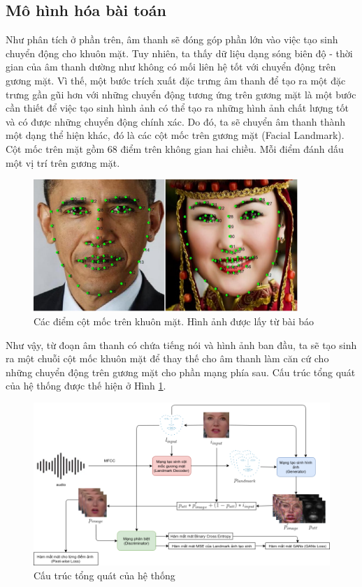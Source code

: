 \subsection{Mô hình hóa bài toán}\label{sec:modeling}

Như phân tích ở phần trên, âm thanh sẽ đóng góp phần lớn vào việc tạo sinh chuyển động cho khuôn mặt. Tuy nhiên, ta thấy dữ liệu dạng sóng biên độ - thời gian của âm thanh dường như không có mối liên hệ tốt với chuyển động trên gương mặt. Vì thế, một bước trích xuất đặc trưng âm thanh để tạo ra một đặc trưng gần gũi hơn với những chuyển động tương ứng trên gương mặt là một bước cần thiết để việc tạo sinh hình ảnh có thể tạo ra những hình ảnh chất lượng tốt và có được những chuyển động chính xác. Do đó, ta sẽ chuyển âm thanh thành một dạng thể hiện khác, đó là các cột mốc trên gương mặt (Facial Landmark). Cột mốc trên mặt gồm 68 điểm trên không gian hai chiều. Mỗi điểm đánh dấu một vị trí trên gương mặt.

\begin{figure}[H]
    \centering
    \includegraphics[width=10cm]{./content/materials/landmark_intro.png}
    \caption{Các điểm cột mốc trên khuôn mặt. Hình ảnh được lấy từ bài báo \cite{landmark}}
\end{figure}

Như vậy, từ đoạn âm thanh có chứa tiếng nói và hình ảnh ban đầu, ta sẽ tạo sinh ra một chuỗi cột mốc khuôn mặt để thay thế cho âm thanh làm căn cứ cho những chuyển động trên gương mặt cho phần mạng phía sau. Cấu trúc tổng quát của hệ thống được thế hiện ở Hình \ref{fig:common_architecture}.

\begin{figure}[H]
    \centering
    \includegraphics[width=15cm]{./content/materials/common_architecture.png}
    \caption{Cấu trúc tổng quát của hệ thống}
    \label{fig:common_architecture}
\end{figure}

